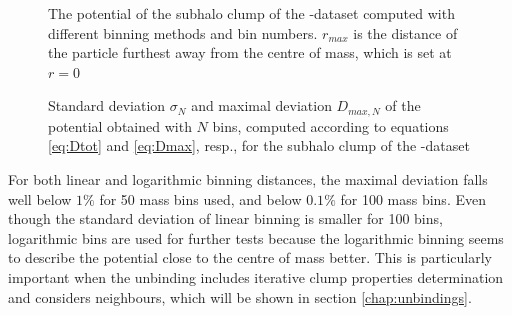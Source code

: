 \begin{figure}[!h]
	\centering
	\caption{
		The potential of the subhalo clump of the \dt-dataset computed with different binning methods and bin numbers.
		$r_{max}$ is the distance of the particle furthest away from the centre of mass, which is set at $r=0$
	}%
	\label{fig:dice-two-binning}
\end{figure}

\begin{figure}[!h]
	\centering
	\caption{ 
		Standard deviation $\sigma_N$ and maximal deviation $D_{max,N}$ of the potential obtained with $N$ bins, computed according to equations \ref{eq:Dtot} and \ref{eq:Dmax}, resp., for the subhalo clump of the \dt-dataset
	}%
	\label{fig:dice-two-binning-analysis}
\end{figure}








For both linear and logarithmic binning distances, the maximal deviation falls well below $1\%$ for 50 mass bins used, and below $0.1 \%$ for 100 mass bins.
Even though the standard deviation of linear binning is smaller for 100 bins, logarithmic bins are used for further tests because the logarithmic binning seems to describe the potential close to the centre of mass better.
This is particularly important when the unbinding includes iterative clump properties determination and considers neighbours, which will be shown in section \ref{chap:unbindings}.

